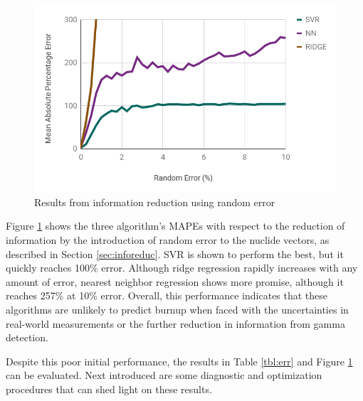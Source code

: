 \begin{figure}[!htb]
  \centering
  \includegraphics[width=\linewidth]{./chapters/demo_method/randerr.png}
  \caption{Results from information reduction using random error}
  \label{fig:randerr}
\end{figure}

Figure \ref{fig:randerr} shows the three algorithm's \gls{MAPE}s with respect
to the reduction of information by the introduction of random error to the
nuclide vectors, as described in Section \ref{sec:inforeduc}.  \gls{SVR} is
shown to perform the best, but it quickly reaches 100\% error.  Although ridge
regression rapidly increases with any amount of error, nearest neighbor
regression shows more promise, although it reaches 257\% at 10\% error.
Overall, this performance indicates that these algorithms are unlikely to
predict burnup when faced with the uncertainties in real-world measurements or
the further reduction in information from gamma detection.

Despite this poor initial performance, the results in Table \ref{tbl:err} and
Figure \ref{fig:randerr} can be evaluated. Next introduced are some diagnostic
and optimization procedures that can shed light on these results.
